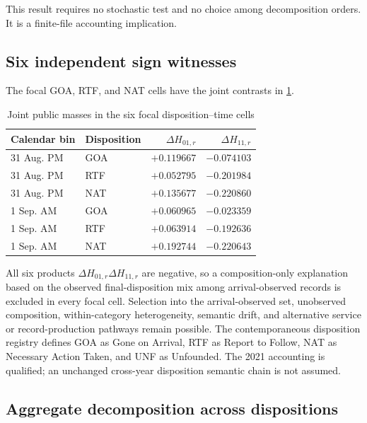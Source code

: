 \documentclass[11pt]{article}
\begin{document}
This result requires no stochastic test and no choice among decomposition orders. It is a finite-file accounting implication.

\subsection{Six independent sign witnesses}

The focal GOA, RTF, and NAT cells have the joint contrasts in \cref{tab:jointsigns}.

\begin{table}[H]
\centering
\caption{Joint public masses in the six focal disposition--time cells}
\label{tab:jointsigns}
\begin{tabular}{@{}llrr@{}}
\toprule
Calendar bin & Disposition & $\Delta H_{01,r}$ & $\Delta H_{11,r}$ \\
\midrule
31 Aug. PM & GOA & $+0.119667$ & $-0.074103$ \\
31 Aug. PM & RTF & $+0.052795$ & $-0.201984$ \\
31 Aug. PM & NAT & $+0.135677$ & $-0.220860$ \\
1 Sep. AM & GOA & $+0.060965$ & $-0.023359$ \\
1 Sep. AM & RTF & $+0.063914$ & $-0.192636$ \\
1 Sep. AM & NAT & $+0.192744$ & $-0.220643$ \\
\bottomrule
\end{tabular}
\end{table}

All six products $\Delta H_{01,r}\Delta H_{11,r}$ are negative, so a composition-only explanation based on the observed final-disposition mix among arrival-observed records is excluded in every focal cell. Selection into the arrival-observed set, unobserved composition, within-category heterogeneity, semantic drift, and alternative service or record-production pathways remain possible. The contemporaneous disposition registry defines GOA as Gone on Arrival, RTF as Report to Follow, NAT as Necessary Action Taken, and UNF as Unfounded. The 2021 accounting is qualified; an unchanged cross-year disposition semantic chain is not assumed.

\subsection{Aggregate decomposition across dispositions}
\end{document}
